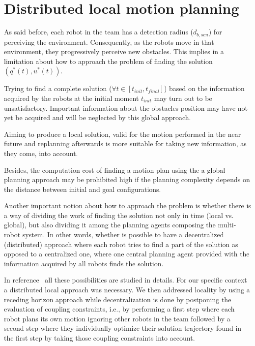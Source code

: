 \chapter{Distributed local motion planning}
\let\cleardoublepage\savecleardoublepage

As said before, each robot in the team has a detection radius ($d_{b,sen}$) for perceiving the environment. Consequently, as the robots move in that environment, they progressively perceive new obstacles. This implies in a limitation about how to approach the problem of finding the solution $(q^{*}(t), u^{*}(t))$.

Trying to find a complete solution ($\forall t \in [t_{init}, t_{final}]$) based on the information acquired by the robots at the initial moment $t_{init}$ may turn out to be unsatisfactory. Important information about the obstacles position may have not yet be acquired and will be neglected by this global approach.

Aiming to produce a local solution, valid for the motion performed in the near future and replanning afterwards is
more suitable for taking new information, as they come, into account.

Besides, the computation cost of finding a motion plan using
the a global planning approach may be prohibited high if the planning complexity depends
on the distance between initial and goal configurations.

Another important notion about how to approach the problem is whether there is a way of dividing the work of finding the solution not only in time (local vs. global), but also dividing it among the planning agents composing the multi-robot system. In other words, whether is possible to have a decentralized (distributed) approach where each robot tries to find a part of the solution as opposed to a centralized one, where one central planning agent provided with the information acquired by all robots finds the solution.

In reference~\cite{Defoort2007a} all these possibilities are studied in details. For our specific context a distributed local approach was necessary.
We then addressed locality by using a receding horizon approach while decentralization is done by postponing the evaluation of coupling constraints, i.e., by performing a first step where each robot plans its own motion ignoring other robots in the team followed by a second step where they individually optimize their solution trajectory found in the first step by taking those coupling constraints into account.

